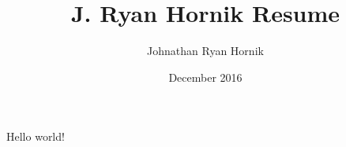 \documentclass{article}
\title{J. Ryan Hornik Resume}
\author{Johnathan Ryan Hornik}
\date{December 2016}
\begin{document}
	\maketitle
	Hello world!
\end{document}
